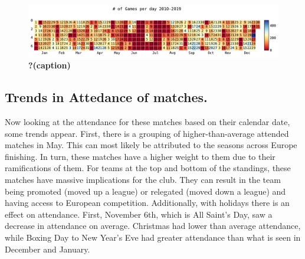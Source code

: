 \documentclass[
  letterpaper,
  DIV=11,
  numbers=noendperiod]{scrartcl}
\begin{document}
\begin{figure}[H]

{\centering \includegraphics{Blog_post_files/figure-pdf/fig-cal_count-output-1.pdf}

}

\caption{\label{fig-cal_count}\textbf{?(caption)}}

\end{figure}

\hypertarget{trends-in-attedance-of-matches.}{%
\subsection{Trends in Attedance of
matches.}\label{trends-in-attedance-of-matches.}}

Now looking at the attendance for these matches based on their calendar
date, some trends appear. First, there is a grouping of
higher-than-average attended matches in May. This can most likely be
attributed to the seasons across Europe finishing. In turn, these
matches have a higher weight to them due to their ramifications of them.
For teams at the top and bottom of the standings, these matches have
massive implications for the club. They can result in the team being
promoted (moved up a league) or relegated (moved down a league) and
having access to European competition. Additionally, with holidays there
is an effect on attendance. First, November 6th, which is All Saint's
Day, saw a decrease in attendance on average. Christmas had lower than
average attendance, while Boxing Day to New Year's Eve had greater
attendance than what is seen in December and January.
\end{document}
